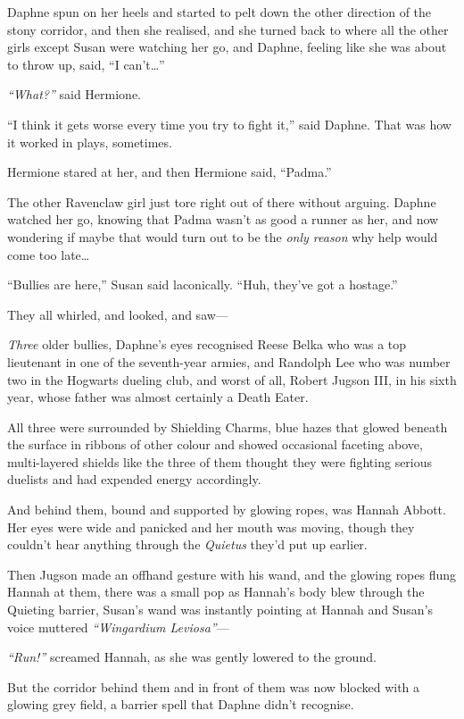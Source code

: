 Daphne spun on her heels and started to pelt down the other direction of
the stony corridor, and then she realised, and she turned back to where
all the other girls except Susan were watching her go, and Daphne,
feeling like she was about to throw up, said, ``I can't\ldots{}''

\emph{``What?''} said Hermione.

``I think it gets worse every time you try to fight it,'' said Daphne.
That was how it worked in plays, sometimes.

Hermione stared at her, and then Hermione said, ``Padma.''

The other Ravenclaw girl just tore right out of there without arguing.
Daphne watched her go, knowing that Padma wasn't as good a runner as
her, and now wondering if maybe that would turn out to be the \emph{only
reason} why help would come too late\ldots{}

``Bullies are here,'' Susan said laconically. ``Huh, they've got a
hostage.''

They all whirled, and looked, and saw---

\emph{Three} older bullies, Daphne's eyes recognised Reese Belka who was
a top lieutenant in one of the seventh-year armies, and Randolph Lee who
was number two in the Hogwarts dueling club, and worst of all, Robert
Jugson III, in his sixth year, whose father was almost certainly a Death
Eater.

All three were surrounded by Shielding Charms, blue hazes that glowed
beneath the surface in ribbons of other colour and showed occasional
faceting above, multi-layered shields like the three of them thought
they were fighting serious duelists and had expended energy accordingly.

And behind them, bound and supported by glowing ropes, was Hannah
Abbott. Her eyes were wide and panicked and her mouth was moving, though
they couldn't hear anything through the \emph{Quietus} they'd put up
earlier.

Then Jugson made an offhand gesture with his wand, and the glowing ropes
flung Hannah at them, there was a small pop as Hannah's body blew
through the Quieting barrier, Susan's wand was instantly pointing at
Hannah and Susan's voice muttered \emph{``Wingardium Leviosa''}---

\emph{``Run!''} screamed Hannah, as she was gently lowered to the
ground.

But the corridor behind them and in front of them was now blocked with a
glowing grey field, a barrier spell that Daphne didn't recognise.

